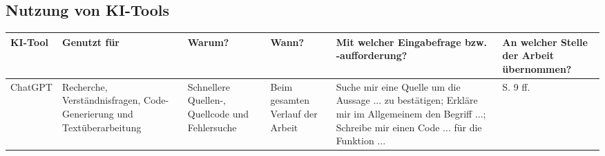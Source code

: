 \newpage

\subsection*{Nutzung von KI-Tools}

\begin{table}
	\begin{small}	
	\begin{tabularx}{\textwidth}{|X|X|X|X|X|X|}
		\hline		
		\textbf{KI-Tool} & \textbf{Genutzt für} & \textbf{Warum?} & \textbf{Wann?} & \textbf{Mit welcher Eingabefrage bzw. -aufforderung?} & \textbf{An welcher Stelle der Arbeit übernommen?}\\
		\hline
		ChatGPT & Recherche, Verständnisfragen, Code-Generierung und Textüberarbeitung & Schnellere Quellen-, Quellcode und Fehlersuche & Beim gesamten Verlauf der Arbeit & Suche mir eine Quelle um die Aussage ... zu bestätigen; Erkläre mir im Allgemeinem den Begriff ...; Schreibe mir einen Code ... für die Funktion ... & S. 9 ff.\\
		\hline
	\end{tabularx}
	\end{small}
\end{table}

